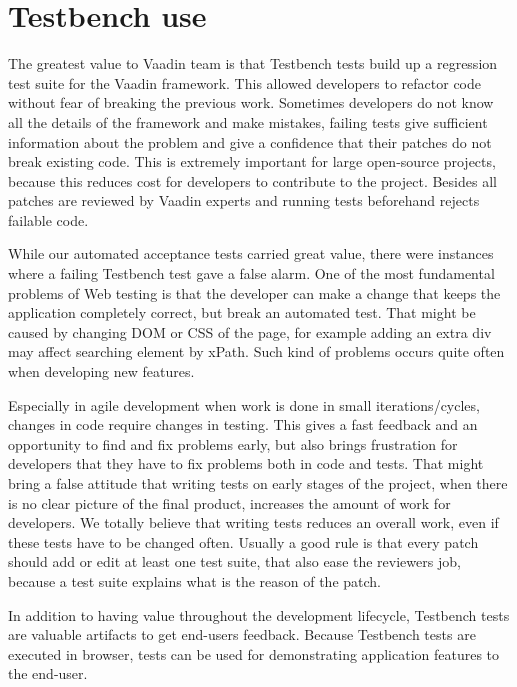 \chapter{Testbench use}
\label{ch:testbenchuse}
The greatest value to Vaadin team is that Testbench tests 
build up a regression test suite for the Vaadin framework. This allowed developers to refactor
 code without fear of breaking the previous work. Sometimes developers do not know all the details
 of the framework and make mistakes, failing tests give sufficient information about the problem 
 and give a confidence that their patches do not break existing code.  
 This is extremely important for large open-source projects,
  because this reduces cost for developers to contribute to the project.
   Besides all patches are reviewed by Vaadin experts and running tests beforehand rejects failable code. 

While our automated acceptance tests carried great value, there were instances
 where a failing Testbench test gave a false alarm. One of the most fundamental
  problems of Web testing is that the developer can make a change that keeps
   the application completely correct, but break an automated test. 
   That might be caused by changing DOM or CSS of the page, for example adding
    an extra div may affect searching element by xPath. Such kind of problems 
    occurs quite often when developing new features. 

Especially in agile development when work is done in small iterations/cycles, 
changes in code require changes in testing. This gives a fast feedback and
 an opportunity to find and fix problems early, but also brings frustration
  for developers that they have to fix problems both in code and tests. 
  That might bring a false attitude that writing tests on early stages of the project,
   when there is no clear picture of the final product,
    increases the amount of work for developers. 
    We totally believe that writing tests reduces an overall work,
     even if these tests have to be changed often.
      Usually a good rule is that every patch should add or edit at least one test suite, that
       also ease the reviewers job, because a test suite explains what is the reason of the patch. 

In addition to having value throughout the development lifecycle,
 Testbench tests are valuable artifacts to get end-users feedback.
  Because Testbench tests are executed in browser, tests can be used 
  for demonstrating application features to the end-user. 
  
